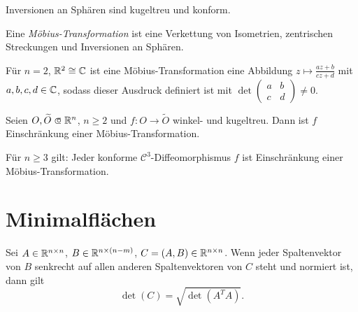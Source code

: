 \documentclass{cheat-sheet}
\begin{document}
\begin{lem}
  Inversionen an Sphären sind kugeltreu und konform.
\end{lem}

\begin{defn}
  Eine \emph{Möbius-Transformation} ist eine Verkettung von Isometrien, zentrischen Streckungen und Inversionen an Sphären.
\end{defn}

\begin{bem}
  Für $n = 2$, $\mathbb{R}^2 \cong \mathbb{C}$ ist eine Möbius-Transformation eine Abbildung $z \mapsto \tfrac{az+b}{cz+d}$ mit $a, b, c, d \in \mathbb{C}$, sodass dieser Ausdruck definiert ist mit $\det \left( \begin{smallmatrix} a & b \\ c & d \end{smallmatrix} \right) \not= 0$.
\end{bem}

\begin{satz}
  Seien $O, \widetilde{O} \opn \R^n$, $n \geq 2$ und $f : O \to \widetilde{O}$ winkel- und kugeltreu. Dann ist $f$ Einschränkung einer Möbius-Transformation.
\end{satz}

\begin{samepage}

\begin{kor}
  Für $n \geq 3$ gilt: Jeder konforme $\mathcal{C}^3$-Diffeomorphismus $f$ ist Einschränkung einer Möbius-Transformation.
\end{kor}


\section{Minimalflächen}


\end{samepage}

\begin{lem}
  Sei $A \in \mathbb{R}^{n \times n}$, $B \in \mathbb{R}^{n \times (n-m)}$, $C = (A, B) \in \mathbb{R}^{n \times n}$. Wenn jeder Spaltenvektor von $B$ senkrecht auf allen anderen Spaltenvektoren von $C$ steht und normiert ist, dann gilt
  \[ \det(C) = \sqrt{ \det(A^T A) }. \]
\end{lem}

\end{document}
